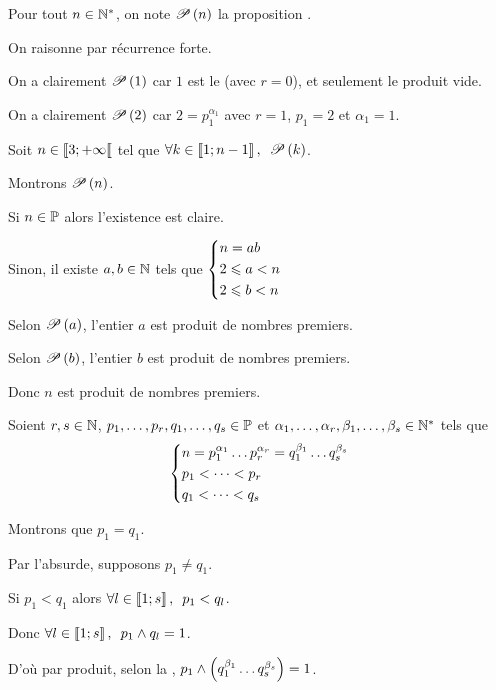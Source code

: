 \begin{dem}
Pour tout \(n\in\Ns\), on note \(\P{n}\) la proposition .

On raisonne par récurrence forte.

On a clairement \(\P{1}\) car \(1\) est le  (avec \(r=0\)), et seulement le produit vide.

On a clairement \(\P{2}\) car \(2=p_1^{\alpha_1}\) avec \(r=1\), \(p_1=2\) et \(\alpha_1=1\).

Soit \(n\in\interventierie{3}{\pinf}\) tel que \(\quantifs{\forall k\in\interventierii{1}{n-1}}\P{k}\).

Montrons \(\P{n}\).

\existence

Si \(n\in\prem\) alors l'existence est claire.

Sinon, il existe \(a,b\in\N\) tels que \(\begin{dcases}n=ab \\ 2\leq a<n \\ 2\leq b<n\end{dcases}\)

Selon \(\P{a}\), l'entier \(a\) est produit de nombres premiers.

Selon \(\P{b}\), l'entier \(b\) est produit de nombres premiers.

Donc \(n\) est produit de nombres premiers.

\unicite

Soient \(r,s\in\N\), \(p_1,\dots,p_r,q_1,\dots,q_s\in\prem\) et \(\alpha_1,\dots,\alpha_r,\beta_1,\dots,\beta_s\in\Ns\) tels que \[\begin{dcases}n=p_1^{\alpha_1}\dots p_r^{\alpha_r}=q_1^{\beta_1}\dots q_s^{\beta_s} \\ p_1<\dots<p_r \\ q_1<\dots<q_s\end{dcases}\]

Montrons que \(p_1=q_1\).

Par l'absurde, supposons \(p_1\not=q_1\).

Si \(p_1<q_1\) alors \(\quantifs{\forall l\in\interventierii{1}{s}}p_1<q_l\).

Donc \(\quantifs{\forall l\in\interventierii{1}{s}}p_1\et q_l=1\).

D'où par produit, selon la , \(p_1\et\paren{q_1^{\beta_1}\dots q_s^{\beta_s}}=1\).


\end{dem}
